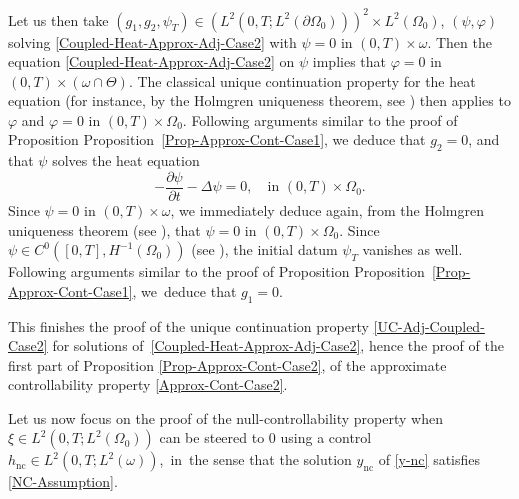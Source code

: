 \documentclass[10pt,a4paper]{amsart}
\newcommand{\nc}{\mathrm{nc}}
\theoremstyle{definition}
\begin{document}
Let us then take $(g_1, g_2, \psi_T) \in (L^2(0,T; L^2(\partial\Omega_0)))^2\times L^2(\Omega_0)$, $(\psi, \varphi)$ solving \eqref{Coupled-Heat-Approx-Adj-Case2} with $\psi = 0$ in $(0,T) \times \omega$. Then the equation \eqref{Coupled-Heat-Approx-Adj-Case2} on $\psi$ implies that $\varphi = 0$ in $(0,T)\times {(\omega\cap \Theta)}$. The classical unique continuation property for the heat equation (for instance, by the Holmgren uniqueness theorem, see \eg \cite[\S8.6 \& Th.\,8.6.5]{Hormander-2003}) then applies to $\varphi$ and $\varphi = 0$ in $(0,T)\times \Omega_0$. Following arguments similar to the proof of Proposition Proposition~\ref{Prop-Approx-Cont-Case1}, we deduce that $g_2 = 0$, and that $\psi$ solves the heat equation
\[
-\dfrac{\partial \psi}{\partial t}-\Delta \psi =0, \quad \text{in }(0,T) \times \Omega_0.
\]
Since $\psi = 0$ in $(0,T) \times \omega$, we immediately deduce again, from the Holmgren uniqueness theorem (see \eg \cite[\S8.6 \& Th.\,8.6.5]{Hormander-2003}), that $\psi = 0$ in $(0,T) \times \Omega_0$. Since $\psi\in C^0([0,T],H^{-1}(\Omega_0))$ (see \eg \cite[Prop.\,7.1.3]{TWBook}), the initial datum $\psi_T$ vanishes as well. Following arguments similar to the proof of Proposition Proposition~\ref{Prop-Approx-Cont-Case1}, we~deduce that $g_1 = 0$.

This finishes the proof of the unique continuation property \eqref{UC-Adj-Coupled-Case2} for solutions of~\eqref{Coupled-Heat-Approx-Adj-Case2}, hence the proof of the first part of Proposition \ref{Prop-Approx-Cont-Case2}, \ie of the approximate controllability property \eqref{Approx-Cont-Case2}.

Let us now focus on the proof of the null-controllability property when~$\xi\in L^2(0,T; L^2(\Omega_0))$ can be steered to $0$ using a control $h_{\nc} \!\in\! L^2(0,T; L^2(\omega))$,~in~the sense that the solution $y_{\nc}$ of \eqref{y-nc} satisfies \eqref{NC-Assumption}.
\end{document}
